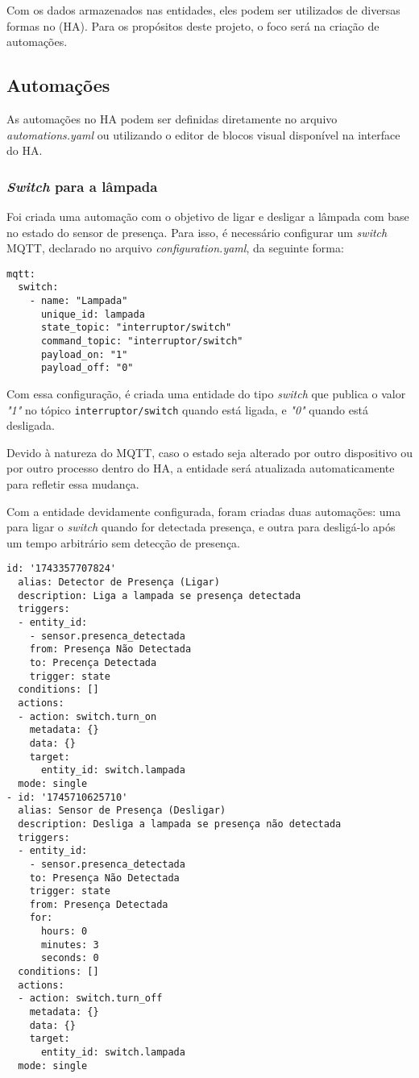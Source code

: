 \documentclass[]{abntex2}
\begin{document}
Com os dados armazenados nas entidades, eles podem ser utilizados de diversas
formas no (HA). Para os propósitos deste projeto, o foco será na
criação de automações.

\subsection{Automações}
As automações no HA podem ser definidas diretamente no arquivo
\textit{automations.yaml} ou utilizando o editor de blocos visual disponível na
interface do HA.

\subsubsection{\textit{Switch} para a lâmpada}

Foi criada uma automação com o objetivo de ligar e desligar a lâmpada com base
no estado do sensor de presença. Para isso, é necessário configurar um
\textit{switch} MQTT, declarado no arquivo \textit{configuration.yaml}, da
seguinte forma:
\clearpage
\begin{verbatim}
mqtt:
  switch:
    - name: "Lampada"
      unique_id: lampada
      state_topic: "interruptor/switch"
      command_topic: "interruptor/switch"
      payload_on: "1"
      payload_off: "0"
\end{verbatim}
Com essa configuração, é criada uma entidade do tipo \textit{switch} que
publica o valor \textit{"1"} no tópico \texttt{interruptor/switch} quando está
ligada, e \textit{"0"} quando está desligada.

Devido à natureza do MQTT, caso o estado seja alterado por outro dispositivo ou
por outro processo dentro do HA, a entidade será atualizada automaticamente
para refletir essa mudança.

Com a entidade devidamente configurada, foram criadas duas automações: uma para
ligar o \textit{switch} quando for detectada presença, e outra para desligá-lo
após um tempo arbitrário sem detecção de presença.

\begin{verbatim}
id: '1743357707824'
  alias: Detector de Presença (Ligar)
  description: Liga a lampada se presença detectada
  triggers:
  - entity_id:
    - sensor.presenca_detectada
    from: Presença Não Detectada
    to: Precença Detectada
    trigger: state
  conditions: []
  actions:
  - action: switch.turn_on
    metadata: {}
    data: {}
    target:
      entity_id: switch.lampada
  mode: single
- id: '1745710625710'
  alias: Sensor de Presença (Desligar)
  description: Desliga a lampada se presença não detectada
  triggers:
  - entity_id:
    - sensor.presenca_detectada
    to: Presença Não Detectada
    trigger: state
    from: Presença Detectada
    for:
      hours: 0
      minutes: 3
      seconds: 0
  conditions: []
  actions:
  - action: switch.turn_off
    metadata: {}
    data: {}
    target:
      entity_id: switch.lampada
  mode: single
\end{verbatim}
\clearpage
\end{document}
